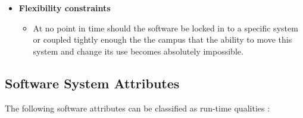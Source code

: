 \documentclass{article}
\begin{document}
			\begin{itemize}
				
				\item \textbf{Flexibility constraints}
				
				\begin{itemize}
					\item At no point in time should the software be locked in to a specific system or coupled tightly enough the the campus that the ability to move this system and change its use becomes absolutely impossible.
				\end{itemize}	
				
			\end{itemize}				
		
		\pagebreak
		
		\subsection{Software System Attributes}
				The following software attributes can be classified as run-time qualities :
\end{document}
